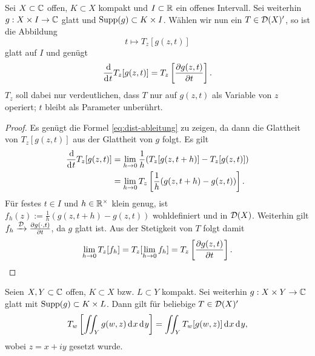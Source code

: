 \begin{lemma}
  \label{lemma:dist-glatt}
  Sei $X \subset \mathbb{C}$ offen, $K \subset X$ kompakt und $I \subset \mathbb{R}$ ein
  offenes Intervall. Sei weiterhin $g: X \times I \rightarrow \mathbb{C}$ glatt und
  $\operatorname{Supp}(g) \subset K \times I$. Wählen wir nun ein $T \in \mathcal{D}(X)'$,
  so ist die Abbildung 
  \[
  t \mapsto T_z[g(z,t)]
  \]
  glatt auf $I$ und genügt
\begin{align}
  \frac{\d}{\d[t]} T_z[g(z,t)] = T_z \left [ \frac{\partial
      g(z,t)}{\partial t} \right ]. \label{eq:dist-ableitung}
  \end{align}
  $T_z$ soll dabei nur verdeutlichen, dass $T$ nur auf $g(z,t)$ als
  Variable von $z$ operiert; $t$ bleibt als Parameter unberührt.
\end{lemma}

\begin{proof}
  Es genügt die Formel \eqref{eq:dist-ableitung} zu zeigen, da dann
  die Glattheit von $T_z[g(z,t)]$ aus der Glattheit von $g$ folgt. 
  Es gilt
  \begin{align*}
    \frac{\d}{\d[t]} T_z[g(z,t)] & = \lim_{h \ra 0} \frac1h (
    T_z[g(z,t+h)] - T_z[g(z,t)] ) \\
    & = \lim_{h \ra 0} T_z \left [ \frac1h (g(z,t+h) - g(z,t)) \right ].
  \end{align*}
  Für festes $t \in I$ und $h \in \mathbb{R}^\times$ klein genug, ist $f_h(z)
  := \frac1h ( g(z, t+h) - g(z,t))$ wohldefiniert und in
  $\mathcal{D}(X)$. Weiterhin gilt $f_h \xrightarrow{\mathcal{D}}
  \frac{\partial g(\cdot, t)}{\partial t}$, da $g$ glatt ist. 
  Aus der Stetigkeit von $T$ folgt damit
  \[
  \lim_{h\rightarrow 0} T_z[f_h] = T_z[\lim_{h \rightarrow 0} f_h] = T_z\left[
    \frac{\partial g(z,t)}{\partial t} \right].
  \]
\end{proof}

\begin{lemma}
  \label{lemma:dist-int}
  Seien $X,Y \subset \mathbb{C}$ offen, $K \subset X$ bzw. $L \subset Y$
  kompakt. Sei weiterhin \break$g: X \times Y \rightarrow \mathbb{C}$ glatt mit $\operatorname{Supp}(g)
  \subset K \times L$. 
  Dann gilt für beliebige $T \in \mathcal{D}(X)'$
  \[
  T_w\left [ \iint_Y g(w,z) \d[x]\d[y] \right ] = \iint_Y T_w [
  g(w,z)] \d[x]\d[y],
  \]
  wobei $z = x + iy$ gesetzt wurde.
\end{lemma}

